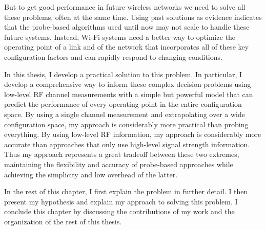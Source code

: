 But to get good performance in future wireless networks we need to solve all these problems, often at the same time. Using past solutions as evidence indicates that the probe-based algorithms used until now may not scale to handle these future systems. Instead, Wi-Fi systems need a better way to optimize the operating point of a link and of the network that incorporates all of these key configuration factors and can rapidly respond to changing conditions.


In this thesis, I develop a practical solution to this problem. In particular, I develop a comprehensive way to inform these complex decision problems using low-level RF channel measurements with a simple but powerful model that can predict the performance of every operating point in the entire configuration space. By using a single channel measurement and extrapolating over a wide configuration space, my approach is considerably more practical than probing everything. By using low-level RF information, my approach is considerably more accurate than approaches that only use high-level signal strength information. Thus my approach represents a great tradeoff between these two extremes, maintaining the flexibility and accuracy of probe-based approaches while achieving the simplicity and low overhead of the latter.

In the rest of this chapter, I first explain the problem in further detail. I then present my hypothesis and explain my approach to solving this problem. I conclude this chapter by discussing the contributions of my work and the organization of the rest of this thesis.

